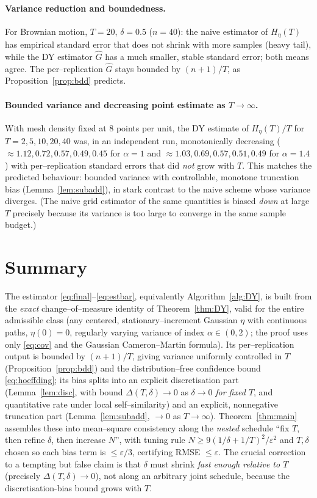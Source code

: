 \documentclass{amsart}
\theoremstyle{definition}
\begin{document}
\paragraph{Variance reduction and boundedness.}
For Brownian motion, $T=20$, $\delta=0.5$ ($n=40$): the naive estimator of
$H_\eta(T)$ has empirical standard error that does not shrink with more samples
(heavy tail), while the DY estimator $\widehat G$ has a much smaller, stable
standard error; both means agree. The per--replication $\widehat G$ stays bounded
by $(n+1)/T$, as Proposition~\ref{prop:bdd} predicts.

\paragraph{Bounded variance and decreasing point estimate as $T\to\infty$.}
With mesh density fixed at $8$ points per unit, the DY estimate of $H_\eta(T)/T$
for $T=2,5,10,20,40$ was, in an independent run, monotonically decreasing
($\approx1.12,0.72,0.57,0.49,0.45$ for $\alpha=1$ and
$\approx1.03,0.69,0.57,0.51,0.49$ for $\alpha=1.4$) with per--replication standard
errors that did \emph{not} grow with $T$. This matches the predicted behaviour:
bounded variance with controllable, monotone truncation bias
(Lemma~\ref{lem:subadd}), in stark contrast to the naive scheme whose variance
diverges. (The naive grid estimator of the same quantities is biased \emph{down}
at large $T$ precisely because its variance is too large to converge in the same
sample budget.)

\section{Summary}

The estimator \eqref{eq:final}--\eqref{eq:estbar}, equivalently
Algorithm~\ref{alg:DY}, is built from the \emph{exact} change--of--measure
identity of Theorem~\ref{thm:DY}, valid for the entire admissible class
(any centered, stationary--increment Gaussian $\eta$ with continuous paths,
$\eta(0)=0$, regularly varying variance of index $\alpha\in(0,2)$; the proof uses
only \eqref{eq:cov} and the Gaussian Cameron--Martin formula). Its per--replication
output is bounded by $(n+1)/T$, giving variance uniformly controlled in $T$
(Proposition~\ref{prop:bdd}) and the distribution--free confidence bound
\eqref{eq:hoeffding}; its bias splits into an explicit discretisation part
(Lemma~\ref{lem:disc}, with bound $\Delta(T,\delta)\to0$ as $\delta\to0$ \emph{for
fixed $T$}, and quantitative rate under local self--similarity) and an explicit,
nonnegative truncation part (Lemma~\ref{lem:subadd}, $\to0$ as $T\to\infty$).
Theorem~\ref{thm:main} assembles these into mean--square consistency along the
\emph{nested} schedule ``fix $T$, then refine $\delta$, then increase $N$'', with
tuning rule $N\ge 9(1/\delta+1/T)^2/\varepsilon^2$ and $T,\delta$ chosen so each
bias term is $\le\varepsilon/3$, certifying RMSE $\le\varepsilon$. The crucial
correction to a tempting but false claim is that $\delta$ must shrink \emph{fast
enough relative to $T$} (precisely $\Delta(T,\delta)\to0$), not along an arbitrary
joint schedule, because the discretisation-bias bound grows with $T$.
\end{document}
